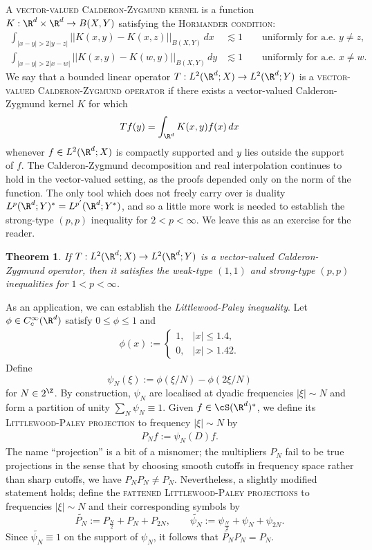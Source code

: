 \documentclass[reqno]{amsart}
\newtheorem{theorem}{Theorem}
\theoremstyle{definition}
\theoremstyle{remark}
\renewcommand{\emph}{\textsc}
\begin{document}
A \emph{vector-valued Calderon-Zygmund kernel} is a function $K : \R^d \times \R^d \to B(X, Y)$ satisfying the \emph{Hormander condition}:
	\begin{align*}
		\int_{|x - y| > 2|y - z|} ||K(x, y) - K(x, z)||_{B(X, Y)} \, dx &\lesssim 1 \qquad \text{uniformly for a.e. $y \neq z$}, \\
		\int_{|x - y| > 2|x - w|} ||K(x, y) - K(w, y)||_{B(X, Y)} \, dy &\lesssim 1 \qquad \text{uniformly for a.e. $x \neq w$}.
	\end{align*}
We say that a bounded linear operator $T: L^2 (\R^d; X) \to L^2 (\R^d;Y)$ is a \emph{vector-valued Calderon-Zygmund operator} if there exists a vector-valued Calderon-Zygmund kernel $K$ for which 
	\begin{equation*}
		Tf(y) = \int_{\R^d} K(x, y) f(x) \, dx
	\end{equation*}
whenever $f \in L^2 (\R^d; X)$ is compactly supported and $y$ lies outside the support of $f$. The Calderon-Zygmund decomposition and real interpolation continues to hold in the vector-valued setting, as the proofs depended only on the norm of the function. The only tool which does not freely carry over is duality $L^p (\R^d; Y)^* = L^{p'} (\R^d ; Y^*)$, and so a little more work is needed to establish the strong-type $(p, p)$ inequality for $2 < p < \infty$. We leave this as an exercise for the reader. 

\begin{theorem}
	If $T: L^2 (\R^d; X) \to L^2 (\R^d; Y)$ is a vector-valued Calderon-Zygmund operator, then it satisfies the weak-type $(1, 1)$ and strong-type $(p, p)$ inequalities for $1 < p < \infty$. 
\end{theorem}

As an application, we can establish the \textit{Littlewood-Paley inequality}. Let $\phi  \in C^\infty_c (\R^d)$ satisfy $0 \leq \phi \leq 1$ and 
\begin{align*}
	\phi(x) 
		:= 
		\begin{cases}
			1 , 				&|x| \leq 1.4, \\
			0, 				&|x| > 1.42. 
		\end{cases}
\end{align*}
Define
	\[ \psi_N (\xi) := \phi(\xi/N) - \phi(2\xi/N)  \]
for $N \in 2^\Z$. By construction, $\psi_N$ are localised at dyadic frequencies $|\xi| \sim N$ and form a partition of unity $\sum_N \psi_N \equiv 1$. Given $f \in \cS (\R^d)^*$, we define its \emph{Littlewood-Paley projection} to frequency $|\xi| \sim N$ by
	\begin{align*}
		P_N f := \psi_N (D) f. 
	\end{align*}	
The name ``projection'' is a bit of a misnomer; the multipliers $P_N$ fail to be true projections in the sense that by choosing smooth cutoffs in frequency space rather than sharp cutoffs, we have $P_N P_N \neq P_N$. Nevertheless, a slightly modified statement holds; define the \emph{fattened Littlewood-Paley projections} to frequencies $|\xi| \sim N$ and their corresponding symbols by
	\[ \widetilde{P_N} := P_{\frac{N}{2}} + P_{N} + P_{2N},\qquad  \widetilde{\psi_N} := \psi_{\frac{N}{2}} + \psi_N + \psi_{2N}. \]
Since $\widetilde{\psi_N} \equiv 1$ on the support of $\psi_N$, it follows that $\widetilde{P_N} P_N = P_N$.
\end{document}
